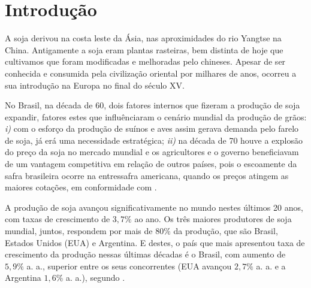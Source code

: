 \documentclass[
	12pt,				%
	openright,			%
	oneside,      %
	a4paper,			%
	english,			%
	french,				%
	spanish,			%
	brazil,				%
	]{abntex2}\usepackage[]{graphicx}\usepackage[table]{xcolor}
\theoremstyle{definition}
\theoremstyle{remark}
\begin{document}

\tableofcontents*
\cleardoublepage

\textual

\chapter[Introdução]{Introdução}



A soja derivou na costa leste da Ásia, nas aproximidades do rio Yangtse na China. Antigamente a soja eram plantas rasteiras, bem distinta de hoje que cultivamos que foram modificadas e melhoradas pelo chineses. Apesar de ser conhecida e consumida pela civilização oriental por milhares de anos, ocorreu a sua introdução na Europa no final do século XV. 

No Brasil, na década de 60, dois fatores internos que fizeram a produção de 
soja expandir, fatores estes que influênciaram o cenário mundial da produção de grãos: \textit{i)} com o esforço da produção de suínos e aves assim gerava demanda pelo farelo de soja, já erá uma necessidade estratégica; \textit{ii)} na década de 70 houve a explosão 
do preço da soja no mercado mundial e os agricultores e o governo beneficiavam de um 
vantagem competitiva em relação de outros países, pois o escoamente da safra brasileira ocorre na entressafra americana, quando os preços atingem as maiores cotações, em conformidade com \cite{embrapa2022}.


A produção de soja avançou significativamente no mundo nestes últimos 20 anos, com taxas 
de crescimento de $3,7\%$ ao ano. Os três maiores produtores de soja mundial, juntos, respondem por mais de $80\%$ da produção, que são Brasil, Estados Unidos (EUA) e Argentina. E destes, o país que mais apresentou taxa de crescimento da produção nessas últimas décadas é o Brasil, com aumento de $5,9\%$ a. a., superior entre os seus concorrentes (EUA avançou $2,7\%$ a. a. e a Argentina $1,6\%$ a. a.), segundo \cite{cepea2022}.
\end{document}
